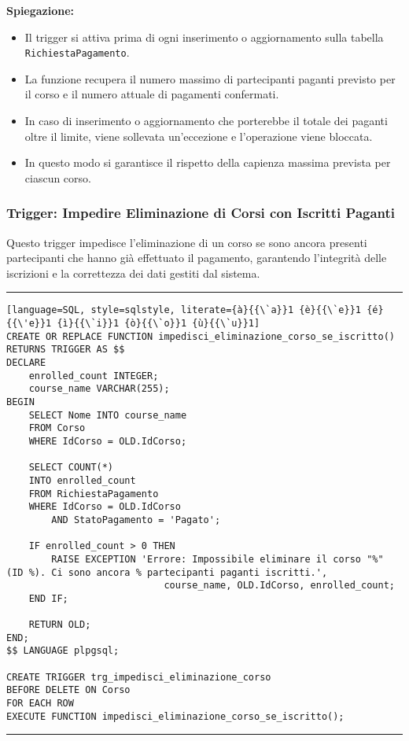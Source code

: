\textbf{Spiegazione:}
\begin{itemize}
    \item Il trigger si attiva prima di ogni inserimento o aggiornamento sulla tabella \texttt{RichiestaPagamento}.
    \item La funzione recupera il numero massimo di partecipanti paganti previsto per il corso e il numero attuale di pagamenti confermati.
    \item In caso di inserimento o aggiornamento che porterebbe il totale dei paganti oltre il limite, viene sollevata un'eccezione e l'operazione viene bloccata.
    \item In questo modo si garantisce il rispetto della capienza massima prevista per ciascun corso.
\end{itemize}

\subsubsection{Trigger: Impedire Eliminazione di Corsi con Iscritti Paganti}

Questo trigger impedisce l'eliminazione di un corso se sono ancora presenti partecipanti che hanno già effettuato il pagamento, garantendo l'integrità delle iscrizioni e la correttezza dei dati gestiti dal sistema.

\noindent\rule{\textwidth}{0.4pt}
\begin{lstlisting}[language=SQL, style=sqlstyle, literate={à}{{\`a}}1 {è}{{\`e}}1 {é}{{\'e}}1 {ì}{{\`i}}1 {ò}{{\`o}}1 {ù}{{\`u}}1]
CREATE OR REPLACE FUNCTION impedisci_eliminazione_corso_se_iscritto()
RETURNS TRIGGER AS $$
DECLARE
    enrolled_count INTEGER;
    course_name VARCHAR(255);
BEGIN
    SELECT Nome INTO course_name
    FROM Corso
    WHERE IdCorso = OLD.IdCorso;

    SELECT COUNT(*)
    INTO enrolled_count
    FROM RichiestaPagamento
    WHERE IdCorso = OLD.IdCorso
        AND StatoPagamento = 'Pagato';

    IF enrolled_count > 0 THEN
        RAISE EXCEPTION 'Errore: Impossibile eliminare il corso "%" (ID %). Ci sono ancora % partecipanti paganti iscritti.',
                            course_name, OLD.IdCorso, enrolled_count;
    END IF;

    RETURN OLD;
END;
$$ LANGUAGE plpgsql;

CREATE TRIGGER trg_impedisci_eliminazione_corso
BEFORE DELETE ON Corso
FOR EACH ROW
EXECUTE FUNCTION impedisci_eliminazione_corso_se_iscritto();
\end{lstlisting}
\noindent\rule{\textwidth}{0.4pt}

